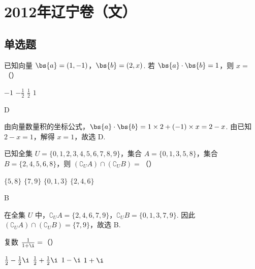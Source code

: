 
\chapter{2012年辽宁卷（文）}

\section{单选题}

\begin{problem}
已知向量 \(\bs{a} = (1, -1)\)，\(\bs{b} = (2, x)\). 若 \(\bs{a} \cdot \bs{b} = 1\)，则 \(x =\)（\quad）

\choices
    {\(-1\)}
    {\( -\frac{1}{2} \)}
    {\( \frac{1}{2} \)}
    {\(1\)}
\end{problem}

\begin{answer}
D
\end{answer}

\begin{solution}
由向量数量积的坐标公式，\(\bs{a}\cdot\bs{b}=1\times2+(-1)\times x=2-x\). 由已知 \(2-x=1\)，解得 \(x=1\)，故选 D.
\end{solution}

\begin{problem}
已知全集 \(U = \{0, 1, 2, 3, 4, 5, 6, 7, 8, 9\}\)，集合 \(A = \{0, 1, 3, 5, 8\}\)，集合 \(B = \{2, 4, 5, 6, 8\}\)，则 \((\complement_U A) \cap (\complement_U B) =\)（\quad）

\choices
    {\(\{5, 8\}\)}
    {\(\{7, 9\}\)}
    {\(\{0, 1, 3\}\)}
    {\(\{2, 4, 6\}\)}
\end{problem}

\begin{answer}
B
\end{answer}

\begin{solution}
在全集 \(U\) 中，\(\complement_U A=\{2,4,6,7,9\}\)，\(\complement_U B=\{0,1,3,7,9\}\). 因此 \(\left(\complement_U A\right)\cap\left(\complement_U B\right)=\{7,9\}\)，故选 B.
\end{solution}

\begin{problem}
复数 \(\frac{1}{1 + \i} =\)（\quad）

\choices
    {\(\frac{1}{2} - \frac{1}{2}\i\)}
    {\(\frac{1}{2} + \frac{1}{2}\i\)}
    {\(1 - \i\)}
    {\(1 + \i\)}
\end{problem}

